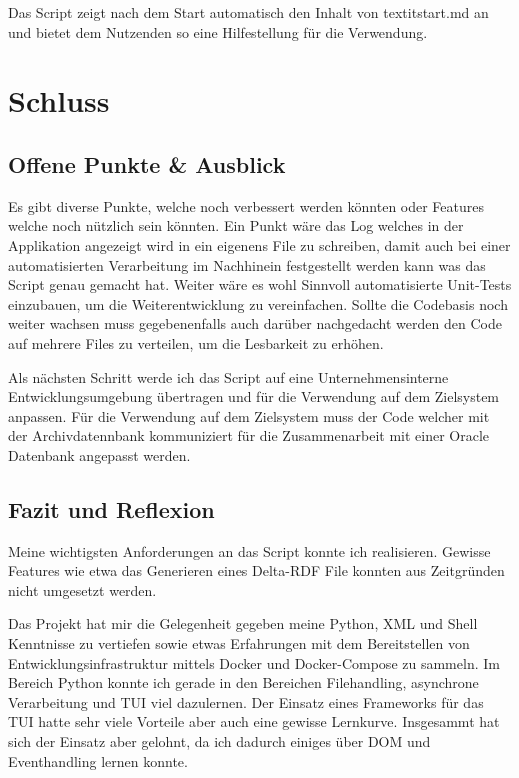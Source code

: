 \documentclass[a4paper,oneside, 12pt]{report}
\begin{document}
Das Script zeigt nach dem Start automatisch den Inhalt von textit{start.md} an und bietet dem Nutzenden so eine Hilfestellung für die Verwendung.


\chapter{Schluss}\label{sec:schluss}
\section{Offene Punkte \& Ausblick}
Es gibt diverse Punkte, welche noch verbessert werden könnten oder Features welche noch nützlich sein könnten. Ein Punkt wäre das Log welches in der Applikation angezeigt wird in ein eigenens File zu schreiben, damit auch bei einer automatisierten Verarbeitung im Nachhinein festgestellt werden kann was das Script genau gemacht hat. Weiter wäre es wohl Sinnvoll automatisierte Unit-Tests einzubauen, um die Weiterentwicklung zu vereinfachen. Sollte die Codebasis noch weiter wachsen muss gegebenenfalls auch darüber nachgedacht werden den Code auf mehrere Files zu verteilen, um die Lesbarkeit zu erhöhen.

Als nächsten Schritt werde ich das Script auf eine Unternehmensinterne Entwicklungsumgebung übertragen und für die Verwendung auf dem Zielsystem anpassen. Für die Verwendung auf dem Zielsystem muss der Code welcher mit der Archivdatennbank kommuniziert für die Zusammenarbeit mit einer Oracle Datenbank angepasst werden.

\section{Fazit und Reflexion}
Meine wichtigsten Anforderungen an das Script konnte ich realisieren. Gewisse Features wie etwa das Generieren eines Delta-RDF File konnten aus Zeitgründen nicht umgesetzt werden.

Das Projekt hat mir die Gelegenheit gegeben meine Python, XML und Shell Kenntnisse zu vertiefen sowie etwas Erfahrungen mit dem Bereitstellen von Entwicklungsinfrastruktur mittels Docker und Docker-Compose zu sammeln. Im Bereich Python konnte ich gerade in den Bereichen Filehandling, asynchrone Verarbeitung und \ac{TUI} viel dazulernen. Der Einsatz eines Frameworks für das TUI hatte sehr viele Vorteile aber auch eine gewisse Lernkurve. Insgesammt hat sich der Einsatz aber gelohnt, da ich dadurch einiges über DOM und Eventhandling lernen konnte.
\end{document}
